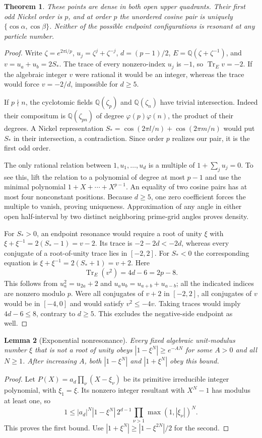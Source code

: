 \documentclass[11pt]{article}
\numberwithin{equation}{section}
\newtheorem{theorem}{Theorem}[section]
\newtheorem{lemma}[theorem]{Lemma}
\theoremstyle{definition}
\newcommand{\ii}{\mathrm i}
\newcommand{\Q}{\mathbb Q}
\begin{document}
\begin{theorem}\label{thm:prime}
These points are dense in both open upper quadrants. Their first
odd Nickel order is $p$, and at order $p$ the unordered cosine
pair is uniquely $\{\cos\alpha,\cos\beta\}$. Neither of the
possible endpoint configurations is resonant at any particle number.
\end{theorem}
\begin{proof}
Write $\zeta=e^{2\pi\ii/p}$, $u_j=\zeta^j+\zeta^{-j}$,
$d=(p-1)/2$, $E=\Q(\zeta+\zeta^{-1})$, and $v=u_a+u_b=2S_*$.
The trace of every nonzero-index $u_j$ is $-1$, so
$\operatorname{Tr}_E v=-2$. If the algebraic integer $v$ were
rational it would be an integer, whereas the trace would force
$v=-2/d$, impossible for $d\ge5$.

If $p\nmid n$, the cyclotomic fields $\Q(\zeta_p)$ and
$\Q(\zeta_n)$ have trivial intersection. Indeed their compositum
is $\Q(\zeta_{pn})$ of degree $\varphi(p)\varphi(n)$, the product
of their degrees. A Nickel representation
$S_* =\cos(2\pi l/n)+\cos(2\pi m/n)$ would put $S_*$ in their
intersection, a contradiction. Since order $p$ realizes our pair,
it is the first odd order.

The only rational relation between $1,u_1,\ldots,u_d$ is a
multiple of $1+\sum_j u_j=0$. To see this, lift the relation to
a polynomial of degree at most $p-1$ and use the minimal
polynomial $1+X+\cdots+X^{p-1}$. An equality of two cosine
pairs has at most four nonconstant positions. Because $d\ge5$,
one zero coefficient forces the multiple to vanish, proving uniqueness.
Approximation of any angle in either open half-interval by two
distinct neighboring prime-grid angles proves density.

For $S_*>0$, an endpoint resonance would require a root of unity
$\xi$ with $\xi+\xi^{-1}=2(S_*-1)=v-2$. Its trace is
$-2-2d<-2d$, whereas every conjugate of a root-of-unity trace lies
in $[-2,2]$. For $S_*<0$ the corresponding equation is
$\xi+\xi^{-1}=2(S_*+1)=v+2$. Here
\[
 \operatorname{Tr}_E(v^2)=4d-6=2p-8.
\]
This follows from $u_a^2=u_{2a}+2$ and
$u_a u_b=u_{a+b}+u_{a-b}$; all the indicated indices are nonzero
modulo $p$. Were all conjugates of $v+2$ in $[-2,2]$, all
conjugates of $v$ would be in $[-4,0]$ and would satisfy
$v^2\le-4v$. Taking traces would imply $4d-6\le8$, contrary
to $d\ge5$. This excludes the negative-side endpoint as well.
\end{proof}

\begin{lemma}[Exponential nonresonance]\label{lem:resultant}
Every fixed algebraic unit-modulus number $\xi$ that is not a root
of unity obeys $|1-\xi^N|\ge e^{-AN}$ for some $A>0$ and all
$N\ge1$. After increasing $A$, both $|1-\xi^N|$ and
$|1+\xi^N|$ obey this bound.
\end{lemma}
\begin{proof}
Let $P(X)=a_d\prod_\nu(X-\xi_\nu)$ be its primitive irreducible
integer polynomial, with $\xi_1=\xi$. Its nonzero integer
resultant with $X^N-1$ has modulus at least one, so
\[
 1\le |a_d|^N|1-\xi^N|\,2^{d-1}
        \prod_{\nu>1}\max(1,|\xi_\nu|)^N.
\]
This proves the first bound. Use
$|1+\xi^N|\ge |1-\xi^{2N}|/2$ for the second.
\end{proof}
\end{document}
